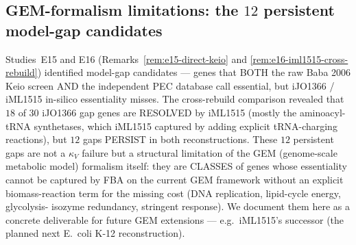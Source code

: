 \documentclass[11pt,a4paper]{article}
\theoremstyle{plain}
\theoremstyle{definition}
\theoremstyle{remark}
\begin{document}
\subsection{GEM-formalism limitations:
the $12$ persistent model-gap candidates}
\label{sec:gem-limitations}

Studies~E15 and E16 (Remarks~\ref{rem:e15-direct-keio} and
\ref{rem:e16-iml1515-cross-rebuild}) identified model-gap candidates
--- genes that BOTH the raw Baba 2006 Keio screen AND the independent
PEC database call essential, but iJO1366 / iML1515 in-silico
essentiality misses. The cross-rebuild comparison revealed that
$18$ of $30$ iJO1366 gap genes are RESOLVED by iML1515 (mostly the
aminoacyl-tRNA synthetases, which iML1515 captured by adding
explicit tRNA-charging reactions), but $12$ gaps PERSIST in both
reconstructions. These $12$ persistent gaps are not a $\kappa_V$
failure but a structural limitation of the GEM (genome-scale
metabolic model) formalism itself: they are CLASSES of genes
whose essentiality cannot be captured by FBA on the current
GEM framework without an explicit biomass-reaction term for
the missing cost (DNA replication, lipid-cycle energy, glycolysis-
isozyme redundancy, stringent response). We document them here as
a concrete deliverable for future GEM extensions --- e.g.~iML1515's
successor (the planned next E.~coli K-12 reconstruction).
\end{document}
